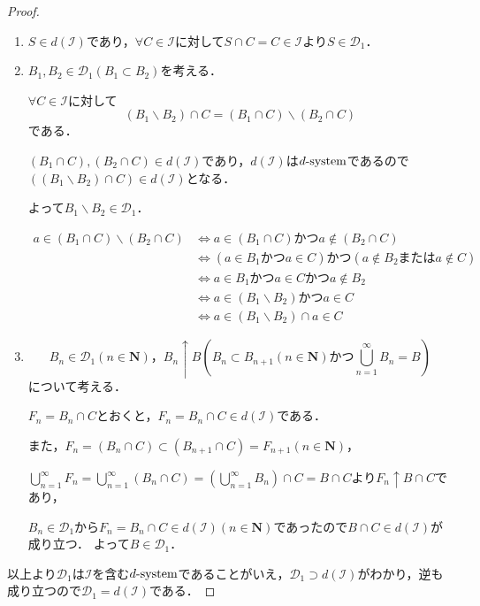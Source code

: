\documentclass{jsarticle}
\begin{document}
\begin{proof}
    \begin{enumerate}
        \item $S\in d(\mathcal{I})$であり，$\forall C\in\mathcal{I}$に対して$S\cap C=C\in\mathcal{I}$より$S\in\mathcal{D}_1$．
        \item $B_1,B_2\in\mathcal{D}_1(B_1\subset B_2)$を考える．\par
            $\forall C\in\mathcal{I}$に対して
            \begin{equation}
                (B_1\backslash B_2)\cap C=(B_1\cap C)\backslash (B_2\cap C) \nonumber
            \end{equation}
            である．\par
            $(B_1\cap C),(B_2\cap C)\in d(\mathcal{I})$であり，$d(\mathcal{I})$は$d{\rm \text{-}system}$であるので$\left((B_1\backslash B_2)\cap C\right)\in d(\mathcal{I})$となる．\par
            よって$B_1\backslash B_2\in\mathcal{D}_1$．
            \begin{itembox}[]{}
                \begin{align}
                    a\in (B_1\cap C)\backslash (B_2\cap C) &\Leftrightarrow a\in (B_1\cap C) かつ a\notin (B_2\cap C) \nonumber \\ 
                    &\Leftrightarrow (a\in B_1 かつ a\in C) かつ (a\notin B_2 または a\notin C) \nonumber \\
                    &\Leftrightarrow a\in B_1 かつ a\in C かつ a\notin B_2 \nonumber \\
                    &\Leftrightarrow a\in(B_1\backslash B_2) かつ a\in C \nonumber \\
                    &\Leftrightarrow a\in(B_1\backslash B_2) \cap a\in C \nonumber
                \end{align}
            \end{itembox}
        \item \begin{equation}
                B_n\in\mathcal{D}_1(n\in\mathbf{N})，B_n\uparrow B \left(B_n\subset B_{n+1}(n\in\mathbf{N}) かつ \bigcup_{n=1}^{\infty}B_n=B\right) \nonumber
            \end{equation}
            について考える．\par
            $F_n=B_n\cap C$とおくと，$F_n=B_n\cap C\in d(\mathcal{I})$である．\par
            また，$F_n=(B_n\cap C)\subset (B_{n+1}\cap C)=F_{n+1} (n\in\mathbf{N})$，\par
            $\bigcup_{n=1}^{\infty}F_n=\bigcup_{n=1}^{\infty}(B_n\cap C)=\left(\bigcup_{n=1}^{\infty}B_n\right)\cap C=B\cap C$より$F_n\uparrow B\cap C$であり，\par
            $B_n\in\mathcal{D}_1$から$F_n=B_n\cap C\in d(\mathcal{I}) (n\in\mathbf{N})$であったので$B\cap C\in d(\mathcal{I})$が成り立つ．
            よって$B\in \mathcal{D}_1$．
    \end{enumerate}
    以上より$\mathcal{D}_1$は$\mathcal{I}$を含む$d{\rm \text{-}system}$であることがいえ，$\mathcal{D}_1\supset d(\mathcal{I})$がわかり，逆も成り立つので$\mathcal{D}_1=d(\mathcal{I})$である．
    

\end{proof}
\end{document}
